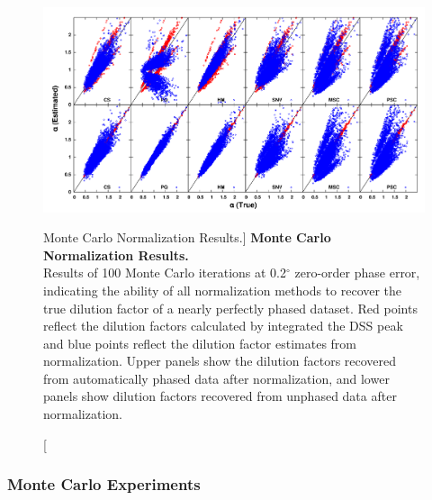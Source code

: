 \begin{figure}[ht!]
\includegraphics[width=6.5in]{figs/pscorr/03-rmse.png}
\caption
      [Monte Carlo Normalization Results.]{
  {\bf Monte Carlo Normalization Results.}
  \\
  Results of 100 Monte Carlo iterations at 0.2$^\circ$ zero-order phase error,
  indicating the ability of all normalization methods to recover the true
  dilution factor of a nearly perfectly phased dataset. Red points reflect the
  dilution factors calculated by integrated the DSS peak and blue points
  reflect the dilution factor estimates from normalization. Upper panels show
  the dilution factors recovered from automatically phased data after
  normalization, and lower panels show dilution factors recovered from
  unphased data after normalization.
}
\end{figure}

\subsubsection{Monte Carlo Experiments}

